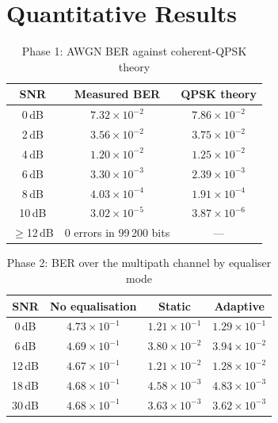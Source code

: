 \documentclass[11pt,a4paper]{report}
\begin{document}
\section{Quantitative Results}

\begin{table}[htbp]
\centering
\small
\begin{tabular}{|c|c|c|}
\hline
\textbf{SNR} & \textbf{Measured BER} & \textbf{QPSK theory} \\
\hline
0\,dB & $7.32\times10^{-2}$ & $7.86\times10^{-2}$ \\
2\,dB & $3.56\times10^{-2}$ & $3.75\times10^{-2}$ \\
4\,dB & $1.20\times10^{-2}$ & $1.25\times10^{-2}$ \\
6\,dB & $3.30\times10^{-3}$ & $2.39\times10^{-3}$ \\
8\,dB & $4.03\times10^{-4}$ & $1.91\times10^{-4}$ \\
10\,dB & $3.02\times10^{-5}$ & $3.87\times10^{-6}$ \\
$\geq$12\,dB & 0 errors in 99\,200 bits & --- \\
\hline
\end{tabular}
\caption{Phase 1: AWGN BER against coherent-QPSK theory}
\end{table}

\begin{table}[htbp]
\centering
\small
\begin{tabular}{|c|c|c|c|}
\hline
\textbf{SNR} & \textbf{No equalisation} & \textbf{Static} & \textbf{Adaptive} \\
\hline
0\,dB & $4.73\times10^{-1}$ & $1.21\times10^{-1}$ & $1.29\times10^{-1}$ \\
6\,dB & $4.69\times10^{-1}$ & $3.80\times10^{-2}$ & $3.94\times10^{-2}$ \\
12\,dB & $4.67\times10^{-1}$ & $1.21\times10^{-2}$ & $1.28\times10^{-2}$ \\
18\,dB & $4.68\times10^{-1}$ & $4.58\times10^{-3}$ & $4.83\times10^{-3}$ \\
30\,dB & $4.68\times10^{-1}$ & $3.63\times10^{-3}$ & $3.62\times10^{-3}$ \\
\hline
\end{tabular}
\caption{Phase 2: BER over the multipath channel by equaliser mode}
\end{table}
\end{document}
